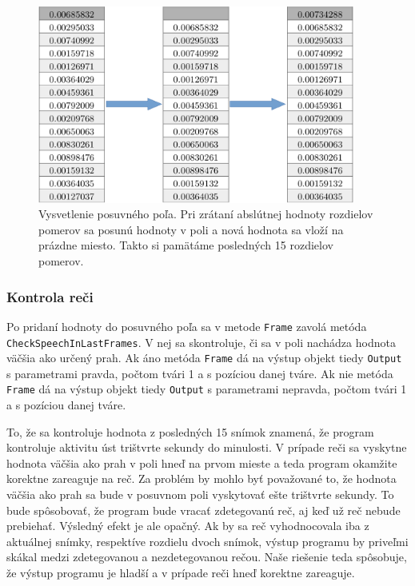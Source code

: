 \begin{figure}[H]
	\begin{center}
		\includegraphics[height=6.5cm]{pics/vysvetleniePosuvnehoPola.png}
		\caption{Vysvetlenie posuvného poľa.
		Pri zrátaní abslútnej hodnoty rozdielov pomerov sa posunú hodnoty v poli a nová hodnota sa vloží na prázdne miesto. 
		Takto si pamätáme posledných 15 rozdielov pomerov.}
		\label{pic-vysvetleniePosuvnehoPola}
	\end{center}
\end{figure}

\subsubsection{Kontrola reči}\label{kontrolaReci}
Po pridaní hodnoty do posuvného poľa sa v metode \texttt{Frame} zavolá metóda \texttt{Check\-Speech\-InLastFrames}.
V nej sa skontroluje, či sa v poli nachádza hodnota väčšia ako určený prah.
Ak áno metóda \texttt{Frame} dá na výstup objekt tiedy \texttt{Output} s parametrami pravda, počtom tvári 1 a s pozíciou danej tváre.
Ak nie metóda \texttt{Frame} dá na výstup objekt tiedy \texttt{Output} s parametrami nepravda, počtom tvári 1 a s pozíciou danej tváre.

To, že sa kontroluje hodnota z posledných 15 snímok znamená, že program kontroluje aktivitu úst trištvrte sekundy do minulosti.
V prípade reči sa vyskytne hodnota väčšia ako prah v poli hneď na prvom mieste a teda program okamžite korektne zareaguje na reč. 
Za problém by mohlo byť považované to, že hodnota väčšia ako prah sa bude v posuvnom poli vyskytovať ešte trištvrte sekundy.
To bude spôsobovať, že program bude vracať zdetegovanú reč, aj keď už reč nebude prebiehať.
Výsledný efekt je ale opačný. 
Ak by sa reč vyhodnocovala iba z aktuálnej snímky, respektíve rozdielu dvoch snímok, výstup programu by priveľmi skákal medzi zdetegovanou a nezdetegovanou rečou.
Naše riešenie teda spôsobuje, že výstup programu je hladší a v prípade reči hneď korektne zareaguje.

